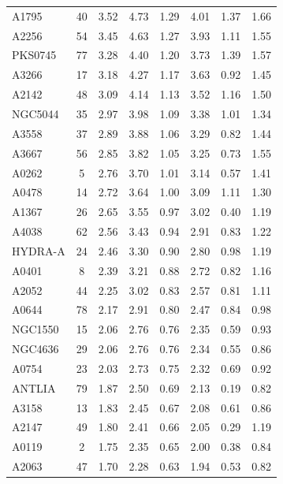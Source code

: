 \documentclass[10pt,aps,pra,reprint,amsmath,amsfonts,amssymb,showpacs,nofootinbib,floatfix]{revtex4-1}
\begin{document}
\begin{table}
\begin{minipage}{2.0\columnwidth}
\begin{tabular}{l  c c c c c c c}
A1795    &  40 &   3.52 &   4.73 &   1.29 &   4.01 &   1.37 &   1.66 \\
A2256    &  54 &   3.45 &   4.63 &   1.27 &   3.93 &   1.11 &   1.55 \\
PKS0745  &  77 &   3.28 &   4.40 &   1.20 &   3.73 &   1.39 &   1.57 \\
A3266    &  17 &   3.18 &   4.27 &   1.17 &   3.63 &   0.92 &   1.45 \\
A2142    &  48 &   3.09 &   4.14 &   1.13 &   3.52 &   1.16 &   1.50 \\
NGC5044  &  35 &   2.97 &   3.98 &   1.09 &   3.38 &   1.01 &   1.34 \\
A3558    &  37 &   2.89 &   3.88 &   1.06 &   3.29 &   0.82 &   1.44 \\
A3667    &  56 &   2.85 &   3.82 &   1.05 &   3.25 &   0.73 &   1.55 \\
A0262    &   5 &   2.76 &   3.70 &   1.01 &   3.14 &   0.57 &   1.41 \\
A0478    &  14 &   2.72 &   3.64 &   1.00 &   3.09 &   1.11 &   1.30 \\
A1367    &  26 &   2.65 &   3.55 &   0.97 &   3.02 &   0.40 &   1.19 \\
A4038    &  62 &   2.56 &   3.43 &   0.94 &   2.91 &   0.83 &   1.22 \\
HYDRA-A  &  24 &   2.46 &   3.30 &   0.90 &   2.80 &   0.98 &   1.19 \\
A0401    &   8 &   2.39 &   3.21 &   0.88 &   2.72 &   0.82 &   1.16 \\
A2052    &  44 &   2.25 &   3.02 &   0.83 &   2.57 &   0.81 &   1.11 \\
A0644    &  78 &   2.17 &   2.91 &   0.80 &   2.47 &   0.84 &   0.98 \\
NGC1550  &  15 &   2.06 &   2.76 &   0.76 &   2.35 &   0.59 &   0.93 \\
NGC4636  &  29 &   2.06 &   2.76 &   0.76 &   2.34 &   0.55 &   0.86 \\
A0754    &  23 &   2.03 &   2.73 &   0.75 &   2.32 &   0.69 &   0.92 \\
ANTLIA   &  79 &   1.87 &   2.50 &   0.69 &   2.13 &   0.19 &   0.82 \\
A3158    &  13 &   1.83 &   2.45 &   0.67 &   2.08 &   0.61 &   0.86 \\
A2147    &  49 &   1.80 &   2.41 &   0.66 &   2.05 &   0.29 &   1.19 \\
A0119    &   2 &   1.75 &   2.35 &   0.65 &   2.00 &   0.38 &   0.84 \\
A2063    &  47 &   1.70 &   2.28 &   0.63 &   1.94 &   0.53 &   0.82 \\

\end{tabular}
\end{minipage}
\end{table}
\end{document}
